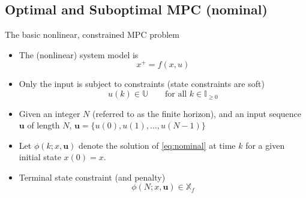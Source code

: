 \documentclass{beamer}
\newcommand{\bbX}{\mathbb{X}}
\newcommand{\bbU}{\mathbb{U}}
\newcommand{\bbI}{\mathbb{I}}
\newcommand{\useq}{\mathbf{u}}
\begin{document}
\subsection{Optimal and Suboptimal MPC (nominal)}

\begin{frame}{The basic nonlinear, constrained MPC problem}

\begin{itemize}
\item The (nonlinear) system model is
\begin{equation}\label{eq:nominal}
x^+ = f(x, u)
\end{equation}

\item Only the input is subject to constraints (state constraints are soft)
\begin{equation*}
u(k)\in \bbU \qquad \text{for all } k\in\bbI_{\geq 0}
\end{equation*}

\item Given an integer $N$ (referred to as the finite horizon), and an
  input sequence $\useq$ of length $N$,  
$\useq = \{ u(0), u(1), \ldots, u(N-1) \}$

\item Let $\phi(k;x,\useq)$
denote the solution of \eqref{eq:nominal} 
at time $k$ for a given initial state $x(0) = x$.

\item Terminal state constraint (and penalty)
\begin{equation*}
\phi(N; x, \useq) \in \bbX_f
\end{equation*}

\end{itemize}

\end{frame}
\end{document}

